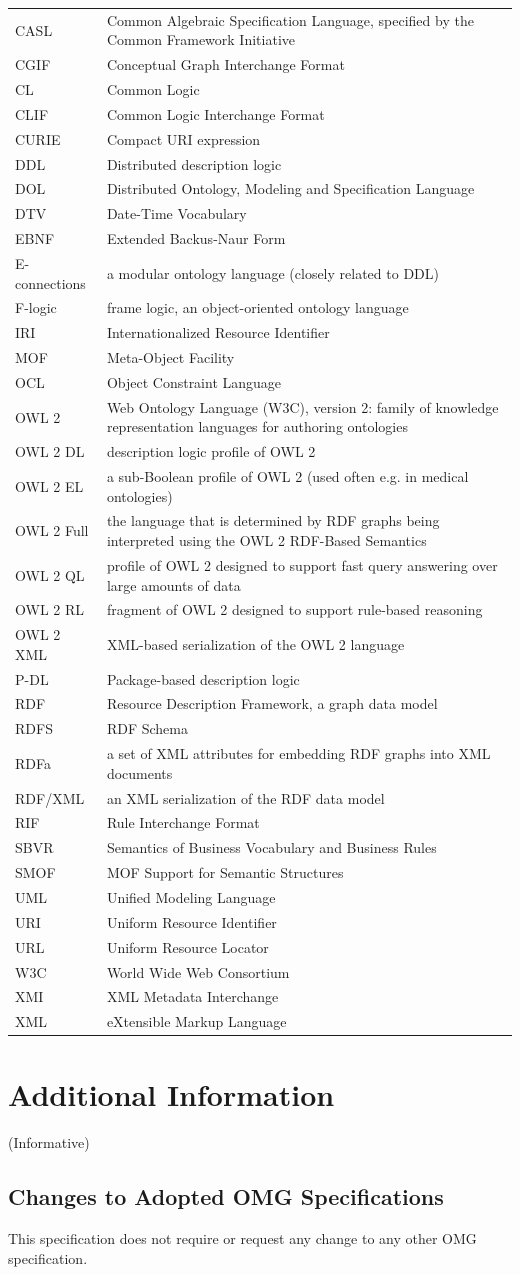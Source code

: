 \documentclass[10pt,fleqn,final]{scrreprt}
\makeatletter
\newcommand*{\eg}{e.g.\@\xspace}
\newenvironment{symbols}[0]{\begin{longtable}{p{.15\textwidth}p{.84\textwidth}}}{\end{longtable}}
\newcommand{\symboldef}[2]{ #1 & #2 \\}
\newcommand{\informative}[0]{{\begin{center}{\Large{(Informative})}\end{center}} \bigskip}
\newcommand{\clauseI}[1]{\chapter{#1} \informative }
\newenvironment{definitions}[0]{\medskip }{}
\makeatother
\begin{document}
\begin{definitions}
\begin{symbols}
\symboldef{CASL}{Common Algebraic Specification Language, specified by the Common Framework Initiative}
\symboldef{CGIF}{Conceptual Graph Interchange Format}
\symboldef{CL}{Common Logic }
\symboldef{CLIF}{Common Logic Interchange Format}
\symboldef{CURIE}{Compact URI expression}
\symboldef{DDL}{Distributed description logic}
\symboldef{DOL}{Distributed Ontology, Modeling and Specification Language}
\symboldef{DTV}{Date-Time Vocabulary}
\symboldef{EBNF}{Extended Backus-Naur Form}
\symboldef{E-connections}{a modular ontology language (closely related to DDL)}
\symboldef{F-logic}{frame logic, an object-oriented ontology language}
\symboldef{IRI}{Internationalized Resource Identifier}
\symboldef{MOF}{Meta-Object Facility}
\symboldef{OCL}{Object Constraint Language}
\symboldef{OWL 2}{Web Ontology Language (W3C), version 2: family of knowledge representation languages for authoring ontologies}
\symboldef{OWL 2 DL}{description logic profile of OWL 2}
\symboldef{OWL 2 EL}{a sub-Boolean profile of OWL 2 (used often \eg in medical ontologies)}
\symboldef{OWL 2 Full}{the language that is determined by RDF graphs being interpreted 
using the OWL 2 RDF-Based Semantics \cite{W3C:REC-owl2-rdf-based-semantics-20091027}}
\symboldef{OWL 2 QL}{profile of OWL 2 designed to support fast query answering over large amounts of data}
\symboldef{OWL 2 RL}{fragment of OWL 2 designed to support rule-based reasoning}
\symboldef{OWL 2 XML}{XML-based serialization of the OWL 2 language}
\symboldef{P-DL}{Package-based description logic}
\symboldef{RDF}{Resource Description Framework, a graph data model}
\symboldef{RDFS}{RDF Schema}
\symboldef{RDFa}{a set of XML attributes for embedding RDF graphs into XML documents}
\symboldef{RDF/XML}{an XML serialization of the RDF data model}
\symboldef{RIF}{Rule Interchange Format}
\symboldef{SBVR}{Semantics of Business Vocabulary and Business Rules}
\symboldef{SMOF}{MOF Support for Semantic Structures}
\symboldef{UML}{Unified Modeling Language}
\symboldef{URI}{Uniform Resource Identifier}
\symboldef{URL}{Uniform Resource Locator}
\symboldef{W3C}{World Wide Web Consortium}
\symboldef{XMI}{XML Metadata Interchange}
\symboldef{XML}{eXtensible Markup Language}
\end{symbols}


\clauseI{Additional Information}

\section{Changes to Adopted OMG Specifications}
This specification does not require or request any change to any other OMG specification. 


\end{definitions}
\end{document}
